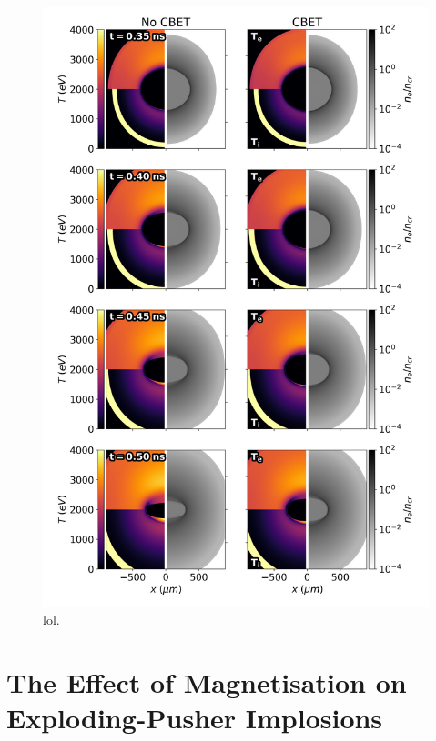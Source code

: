 \begin{figure}[t!]
    \includegraphics[width=0.9\linewidth]{Results2/Images/unmag_CBET_onoff.png}
    \centering
    \caption{lol.}%
    \label{fig:Res2_unmag_CBET_onoff}
\end{figure}



\section{The Effect of Magnetisation on Exploding-Pusher Implosions}%
\label{sec:Res2_mag_unmag}

